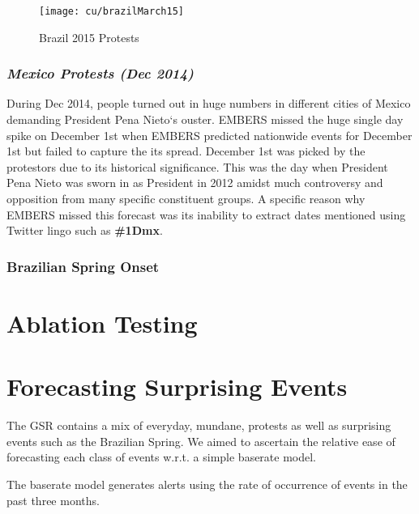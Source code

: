 \begin{figure}[H]
\centering
\texttt{[image: cu/brazilMarch15]}
\caption{Brazil 2015 Protests}
\label{fig:brazilSpring}
\end{figure}

\subsubsection{\it Mexico Protests (Dec 2014)}
During Dec 2014, people turned out in huge numbers in different cities of Mexico demanding
President Pena Nieto`s ouster. 
EMBERS missed the huge single day spike on December 1st when
EMBERS predicted nationwide events for December 1st but failed to
capture the its spread.  
December 1st was picked by the protestors due to
its historical significance. This was the day when President Pena Nieto was sworn
in as President in 2012 amidst much controversy and opposition from
many specific constituent groups. A specific reason why EMBERS missed this forecast
was its inability to extract dates mentioned using Twitter lingo such as {\bf \#1Dmx}.

\subsubsection{Brazilian Spring Onset}

\section{Ablation Testing}

\section{Forecasting Surprising Events}
The GSR contains a mix of everyday, mundane, protests as well as surprising events such as the Brazilian Spring.
We aimed to ascertain the relative ease of forecasting each class of events w.r.t. a simple baserate model.

The baserate model generates alerts using the rate of occurrence of events in the past three months. 

